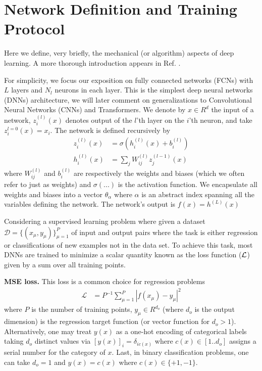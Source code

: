 \section{Network Definition and Training Protocol}
\label{Sec:TrainingProtocols}
Here we define, very briefly, the mechanical (or algorithm) aspects of deep learning. A more thorough introduction appears in Ref. \cite{nielsenneural}.  

For simplicity, we focus our exposition on fully connected networks (FCNs) with $L$ layers and $N_l$ neurons in each layer. This is the simplest deep neural networks (DNNs) architecture, we will later comment on generalizations to Convolutional Neural Networks (CNNs) and Transformers. We denote by $x \in R^d$ the input of a network, $z_i^{(l)}(x)$ denotes output of the $l$'th layer on the $i$'th neuron, and take $z_i^{l=0}(x)=x_i$. The network is defined recursively by 
\begin{align}
z^{(l)}_{i}(x) &= \sigma(h_{i}^{(l)}(x)+b^{(l)}_i) \\ \nonumber 
h^{(l)}_{i}(x) &= \sum_{j} W^{(l)}_{ij} z^{(l-1)}_j(x) 
\end{align}
where $W^{(l)}_{ij}$ and $b^{(l)}_i$ are respectively the weights and biases (which we often refer to just as weights) and $\sigma(...)$ is the activation function. We encapsulate all weights and biases into a vector $\theta_{\alpha}$ where $\alpha$ is an abstract index spanning all the variables defining the network. The network's output is $f(x)=h^{(L)}(x)$

Considering a supervised learning problem where given a dataset $\mathcal{D} =\{(x_\mu, y_\mu)\}_{\mu=1}^P$ of input and output pairs where the task is either regression or classifications of new examples not in the data set. To achieve this task, most DNNs are trained to minimize a scalar quantity known as the loss function ($\mathcal{L}$) given by a sum over all training points. 

{\bf MSE loss.} This loss is a common choice for regression problems 
\begin{align}
\mathcal{L} &= P^{-1}\sum_{\mu=1}^P |f(x_{\mu})-y_{\mu}|^2
\end{align}
where $P$ is the number of training points, $y_{\mu} \in R^{d_o}$ (where $d_o$ is the output dimension) is the regression target function (or vector function for $d_o>1$). Alternatively, one may treat $y(x)$ as a one-hot encoding of categorical labels taking $d_o$ distinct values via $[y(x)]_i = \delta_{i c(x)}$ where $c(x) \in [1..d_o]$ assigns a serial number for the category of $x$. Last, in binary classification problems, one can take $d_o=1$ and $y(x)=c(x)$ where $c(x) \in 
\{+1,-1\}$. 

